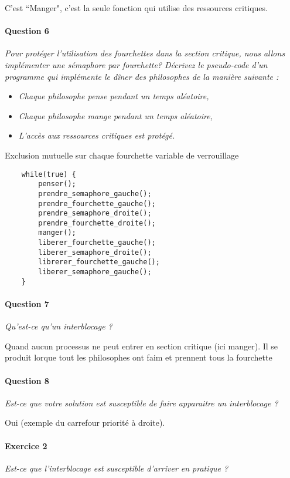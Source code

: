 \documentclass[11pt, a4paper]{article}
\begin{document}
C'est ``Manger", c'est la seule fonction qui utilise des ressources critiques.

\paragraph{Question 6} \emph{Pour protéger l'utilisation des fourchettes dans la section critique, nous allons implémenter une sémaphore par fourchette? Décrivez le pseudo-code d'un programme qui implémente le dîner des philosophes de la manière suivante :}

    \begin{itemize}
    \item \emph{Chaque philosophe pense pendant un temps aléatoire,}
    \item \emph{Chaque philosophe mange pendant un temps aléatoire,}
    \item \emph{L'accès aux ressources critiques est protégé.}
    \end{itemize}

Exclusion mutuelle sur chaque fourchette variable de verrouillage

    \begin{verbatim}
    while(true) {
        penser();
        prendre_semaphore_gauche();
        prendre_fourchette_gauche();
        prendre_semaphore_droite();
        prendre_fourchette_droite();
        manger();
        liberer_fourchette_gauche();
        liberer_semaphore_droite();
        librerer_fourchette_gauche();
        liberer_semaphore_gauche();
    }
    \end{verbatim}

\paragraph{Question 7} \emph{Qu'est-ce qu'un interblocage ?}

Quand aucun processus ne peut entrer en section critique (ici manger). Il se produit lorque tout les philosophes ont faim et prennent tous la fourchette

\paragraph{Question 8} \emph{Est-ce que votre solution est susceptible de faire apparaitre un interblocage ?}

Oui (exemple du carrefour priorité à droite).

\paragraph{Exercice 2} \emph{Est-ce que l'interblocage est susceptible d'arriver en pratique ?}
\end{document}
